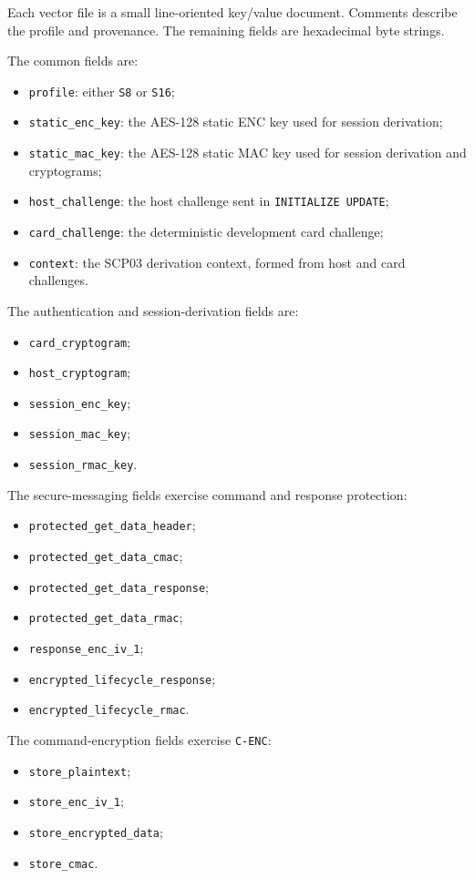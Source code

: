 Each vector file is a small line-oriented key/value document. Comments describe
the profile and provenance. The remaining fields are hexadecimal byte strings.

The common fields are:
\begin{itemize}
\item \texttt{profile}: either \texttt{S8} or \texttt{S16};
\item \texttt{static\_enc\_key}: the AES-128 static ENC key used for session
      derivation;
\item \texttt{static\_mac\_key}: the AES-128 static MAC key used for session
      derivation and cryptograms;
\item \texttt{host\_challenge}: the host challenge sent in
      \texttt{INITIALIZE UPDATE};
\item \texttt{card\_challenge}: the deterministic development card challenge;
\item \texttt{context}: the SCP03 derivation context, formed from host and
      card challenges.
\end{itemize}

The authentication and session-derivation fields are:
\begin{itemize}
\item \texttt{card\_cryptogram};
\item \texttt{host\_cryptogram};
\item \texttt{session\_enc\_key};
\item \texttt{session\_mac\_key};
\item \texttt{session\_rmac\_key}.
\end{itemize}

The secure-messaging fields exercise command and response protection:
\begin{itemize}
\item \texttt{protected\_get\_data\_header};
\item \texttt{protected\_get\_data\_cmac};
\item \texttt{protected\_get\_data\_response};
\item \texttt{protected\_get\_data\_rmac};
\item \texttt{response\_enc\_iv\_1};
\item \texttt{encrypted\_lifecycle\_response};
\item \texttt{encrypted\_lifecycle\_rmac}.
\end{itemize}

The command-encryption fields exercise \texttt{C-ENC}:
\begin{itemize}
\item \texttt{store\_plaintext};
\item \texttt{store\_enc\_iv\_1};
\item \texttt{store\_encrypted\_data};
\item \texttt{store\_cmac}.
\end{itemize}

